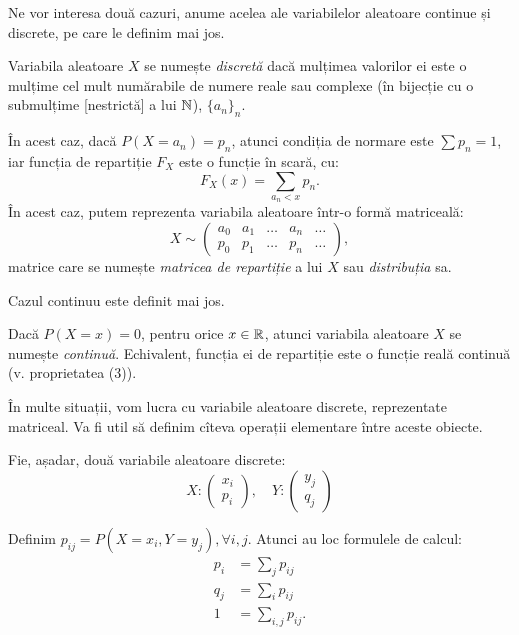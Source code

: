 Ne vor interesa două cazuri, anume acelea ale variabilelor aleatoare continue și discrete,
pe care le definim mai jos.

\begin{definition}\label{def:v-disc}
  Variabila aleatoare $ X $ se numește \emph{discretă} dacă mulțimea valorilor
  ei este o mulțime cel mult numărabile de numere reale sau complexe (în bijecție
  cu o submulțime [nestrictă] a lui $ \mathbb{N} $), $ \{a_n\}_n $.
\end{definition}

În acest caz, dacă $ P(X = a_n) = p_n $, atunci condiția de normare este $ \sum p_n = 1 $,
iar funcția de repartiție $ F_X $ este o funcție în scară, cu:
\[
  F_X(x) = \sum_{a_n < x} p_n.
\]
În acest caz, putem reprezenta variabila aleatoare într-o formă matriceală:
\[
  X \sim %
  \begin{pmatrix}
    a_0 & a_1 & \dots & a_n & \dots \\
    p_0 & p_1 & \dots & p_n & \dots
  \end{pmatrix},
\]
matrice care se numește \emph{matricea de repartiție} a lui $ X $ sau \emph{distribuția} sa.

Cazul continuu este definit mai jos.

\begin{definition}\label{def:v-cont}
  Dacă $ P(X = x) = 0 $, pentru orice $ x \in \mathbb{R} $, atunci variabila aleatoare $ X $ se numește
  \emph{continuă}. Echivalent, funcția ei de repartiție este o funcție reală continuă
  (v. proprietatea (3)).
\end{definition}

În multe situații, vom lucra cu variabile aleatoare discrete, reprezentate matriceal. Va fi
util să definim cîteva operații elementare între aceste obiecte.

Fie, așadar, două variabile aleatoare discrete:
\[
  X : \begin{pmatrix} x_i \\ p_i \end{pmatrix}, \quad %
  Y : \begin{pmatrix} y_j \\ q_j \end{pmatrix}
\]

Definim $ p_{ij} = P(X = x_i, Y = y_j), \forall i,j $. Atunci au loc formulele de calcul:
\begin{align*}
  p_i &= \sum_j p_{ij} \\
  q_j &= \sum_i p_{ij} \\
  1 &= \sum_{i,j} p_{ij}.
\end{align*}


